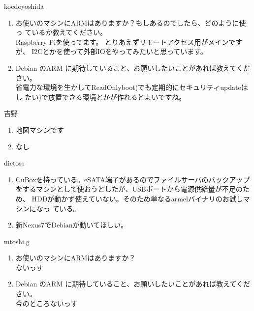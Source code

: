 
\begin{prework}{ koedoyoshida }

\begin{enumerate}
\item お使いのマシンにARMはありますか？もしあるのでしたら、どのように使っ
ているか教えてください。\\
Raspberry Piを使ってます。
とりあえずリモートアクセス用がメインですが、
I2Cとかを使って外部IOをやってみたいと思っています。
\item  Debian のARM に期待していること、お願いしたいことがあれば教えてくだ
さい。\\
省電力な環境を生かしてReadOnlyboot(でも定期的にセキュリティupdateはし
たい)で放置できる環境とかが作れるとよいですね。
\end{enumerate}

\end{prework}

\begin{prework}{ 吉野 }
\begin{enumerate}
\item  地図マシンです
\item なし 
\end{enumerate}
\end{prework}

\begin{prework}{ dictoss}
\begin{enumerate}
\item  CuBoxを持っている。eSATA端子があるのでファイルサーバのバックアップ
をするマシンとして使おうとしたが、USBポートから電源供給量が不足のため、
HDDが動かず使えていない。そのため単なるarmelバイナリのお試しマシンになっ
ている。

\item  新Nexus7でDebianが動いてほしい。
\end{enumerate}
\end{prework}

\begin{prework}{ mtoshi.g }
\begin{enumerate}
\item  お使いのマシンにARMはありますか？\\
ないっす

\item  Debian のARM に期待していること、お願いしたいことがあれば教えてくだ
さい。\\
今のところないっす
\end{enumerate}
\end{prework}

